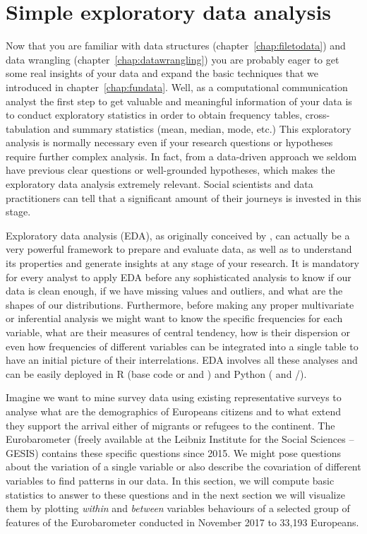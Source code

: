 \section{Simple exploratory data analysis}

Now that you are familiar with data structures (chapter~\ref{chap:filetodata}) and data wrangling (chapter~\ref{chap:datawrangling}) you are probably eager to get some real insights of your data and expand the basic techniques that we introduced in chapter~\ref{chap:fundata}. Well, as a computational communication analyst the first step to get valuable and meaningful information of your data is to conduct exploratory statistics in order to obtain frequency tables, cross-tabulation and summary statistics (mean, median, mode, etc.)  This exploratory analysis is normally necessary even if your research questions or hypotheses require further complex analysis. In fact, from a data-driven approach we seldom have previous clear questions or well-grounded hypotheses, which makes the exploratory data analysis extremely relevant. Social scientists and data practitioners can tell that a significant amount of their journeys is invested in this stage.

Exploratory data analysis (EDA), as originally conceived by \cite{tukey1977exploratory}, can actually be a very powerful framework to prepare and evaluate data, as well as to understand its properties and generate insights at any stage of your research.  It is mandatory for every analyst to apply EDA before any sophisticated analysis to know if our data is clean enough, if we have missing values and outliers, and what are the shapes of our distributions. Furthermore, before making any proper multivariate or inferential analysis we might want to know the specific frequencies for each variable, what are their measures of central tendency, how is their dispersion or even how frequencies of different variables can be integrated into a single table to have an initial picture of their interrelations. EDA involves all these analyses and can be easily deployed in R (base code or and ) and Python ( and /).

Imagine we want to mine survey data using existing representative surveys to analyse what are the demographics of Europeans citizens and to what extend they support the arrival either of migrants or refugees to the continent. The Eurobarometer (freely available at the Leibniz Institute for the Social Sciences – GESIS) contains these specific questions since 2015. We might pose questions about the variation of a single variable or also describe the covariation of different variables to find patterns in our data. In this section, we will compute basic statistics to answer to these questions and in the next section we will visualize them by plotting \textit{within} and \textit{between} variables behaviours of a selected group of features of the Eurobarometer conducted in November 2017 to 33,193 Europeans. 

